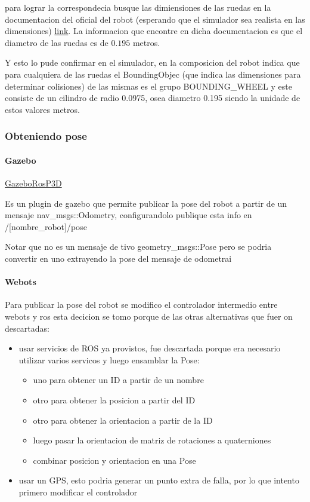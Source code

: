 para lograr la correspondecia busque las dimiensiones de las ruedas en la documentacion del oficial del robot (esperando que el simulador sea realista en las dimensiones) \href{https://www.generationrobots.com/media/Pioneer3DX-P3DX-RevA.pdf}{link}. La informacion que encontre en dicha documentacion es que el diametro de las ruedas es de $0.195$ metros.

Y esto lo pude confirmar en el simulador, en la composicion del robot indica que para cualquiera de las ruedas el BoundingObjec (que indica las dimensiones para determinar colisiones) de las mismas es el grupo BOUNDING\_WHEEL y este consiste de un cilindro de radio 0.0975, osea diametro 0.195 siendo la unidade de estos valores metros.

\subsubsection{Obteniendo pose}
\paragraph{Gazebo}

\href{http://docs.ros.org/en/electric/api/gazebo_plugins/html/group__GazeboRosP3D.html}{GazeboRosP3D}

Es un plugin de gazebo que permite publicar la pose del robot a partir de un mensaje nav\_msgs::Odometry, configurandolo publique esta info en /[nombre\_robot]/pose

Notar que no es un mensaje de tivo geometry\_msgs::Pose pero se podria convertir en uno extrayendo la pose del mensaje de odometrai

\paragraph{Webots}
Para publicar la pose del robot se modifico el controlador intermedio entre webots y ros esta decicion se tomo porque de las otras alternativas que fuer on descartadas:
\begin{itemize}
  \item usar servicios de ROS ya provistos, fue descartada porque era necesario utilizar varios servicos y luego ensamblar la Pose:
  \begin{itemize}
    \item uno para obtener un ID a partir de un nombre
    \item otro para obtener la posicion a partir del ID 
    \item otro para obtener la orientacion a partir de la ID
    \item luego pasar la orientacion de matriz de rotaciones a quaterniones
    \item combinar posicion y orientacion en una Pose 
  \end{itemize}
\item usar un GPS, esto podria generar un punto extra de falla, por lo que intento primero modificar el controlador 
\end{itemize}

